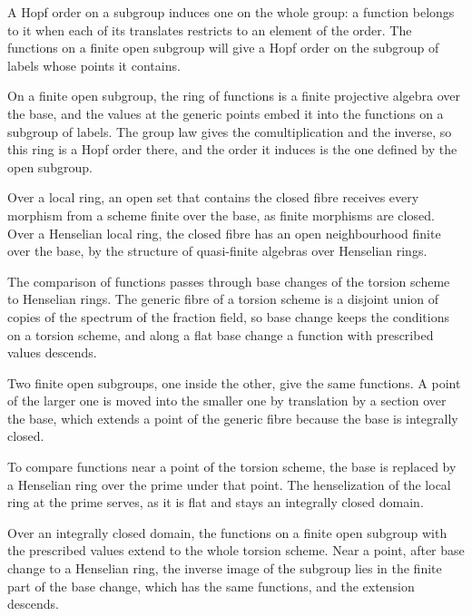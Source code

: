 A Hopf order on a subgroup induces one on the whole group: a function belongs to it when each of its translates restricts
to an element of the order. The functions on a finite open subgroup will give a Hopf order on the subgroup of labels whose
points it contains.

On a finite open subgroup, the ring of functions is a finite projective algebra over the base, and the values at the
generic points embed it into the functions on a subgroup of labels. The group law gives the comultiplication and the
inverse, so this ring is a Hopf order there, and the order it induces is the one defined by the open subgroup.

Over a local ring, an open set that contains the closed fibre receives every morphism from a scheme finite over the base,
as finite morphisms are closed. Over a Henselian local ring, the closed fibre has an open neighbourhood finite over the
base, by the structure of quasi-finite algebras over Henselian rings.

The comparison of functions passes through base changes of the torsion scheme to Henselian rings. The generic fibre of a
torsion scheme is a disjoint union of copies of the spectrum of the fraction field, so base change keeps the conditions on a
torsion scheme, and along a flat base change a function with prescribed values descends.

Two finite open subgroups, one inside the other, give the same functions. A point of the larger one is moved into the
smaller one by translation by a section over the base, which extends a point of the generic fibre because the base is
integrally closed.

To compare functions near a point of the torsion scheme, the base is replaced by a Henselian ring over the prime under
that point. The henselization of the local ring at the prime serves, as it is flat and stays an integrally closed domain.

Over an integrally closed domain, the functions on a finite open subgroup with the prescribed values extend to the whole
torsion scheme. Near a point, after base change to a Henselian ring, the inverse image of the subgroup lies in the finite
part of the base change, which has the same functions, and the extension descends.

